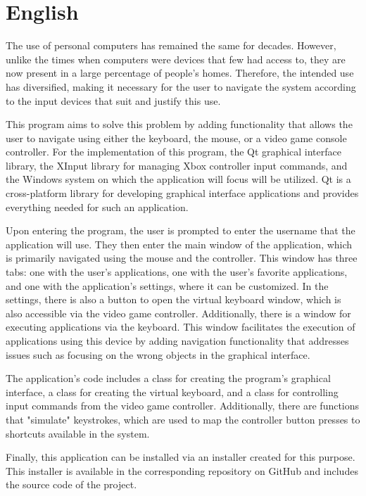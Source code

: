 \newpage
\section{English}
The use of personal computers has remained the same for decades. However, unlike the times when computers were devices that few had access to, they are now present in a large percentage of people's homes. Therefore, the intended use has diversified, making it necessary for the user to navigate the system according to the input devices that suit and justify this use.

This program aims to solve this problem by adding functionality that allows the user to navigate using either the keyboard, the mouse, or a video game console controller. For the implementation of this program, the Qt graphical interface library, the XInput library for managing Xbox controller input commands, and the Windows system on which the application will focus will be utilized. Qt is a cross-platform library for developing graphical interface applications and provides everything needed for such an application.

Upon entering the program, the user is prompted to enter the username that the application will use. They then enter the main window of the application, which is primarily navigated using the mouse and the controller. This window has three tabs: one with the user's applications, one with the user's favorite applications, and one with the application's settings, where it can be customized. In the settings, there is also a button to open the virtual keyboard window, which is also accessible via the video game controller. Additionally, there is a window for executing applications via the keyboard. This window facilitates the execution of applications using this device by adding navigation functionality that addresses issues such as focusing on the wrong objects in the graphical interface.

The application's code includes a class for creating the program's graphical interface, a class for creating the virtual keyboard, and a class for controlling input commands from the video game controller. Additionally, there are functions that "simulate" keystrokes, which are used to map the controller button presses to shortcuts available in the system.

Finally, this application can be installed via an installer created for this purpose. This installer is available in the corresponding repository on GitHub and includes the source code of the project.